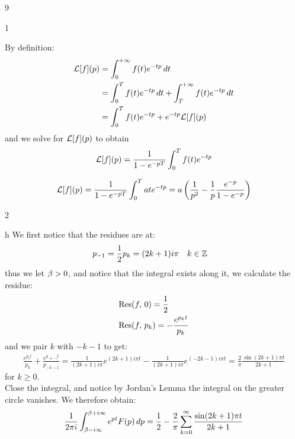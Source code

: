 





\begin{vv286}{9}
  \begin{vv286_mp}{1}
  \item[(i)]
    By definition:
    \begin{align*}
      {\mathcal{L}}[f](p)&=\int_{0}^{+\infty}f(t)e^{-tp}\, dt\\
      &=\int_0^{T}f(t)e^{-tp}\, dt+\int_{T}^{+\infty}f(t)e^{-tp}\, dt\\
      &=\int_0^{T}f(t)e^{-tp}+e^{-tp}\mathcal{L}[f](p)
    \end{align*}
    and we solve for $\mathcal{L}[f](p)$ to obtain
    \begin{equation*}
      \mathcal{L}[f](p)=\frac{1}{1-e^{-pT}}\int_0^{T}f(t)e^{-tp}
    \end{equation*}
   \item[(ii)]
     \begin{align*}
       \mathcal{L}[f](p)=\frac{1}{1-e^{-pT}}\int_0^{T}ate^{-tp}=a\left(\frac{1}{p^2}-\frac{1}{p}\frac{e^{-p}}{1-e^{-p}}\right)
     \end{align*}
  \end{vv286_mp}
  \begin{vv286_mp}{2}
  \item[(i)]h
    We first notice that the residues are at:
    \begin{align*}
      p_{-1}=\frac{1}{2}&
      p_{k}=(2k+1)i\pi\quad k\in\mathbb{Z}
    \end{align*}
    thus we let $\beta>0$, and notice that the integral exists along it, we
    calculate the residue:
   \begin{align*}
     &\hbox{$\mathop{\rm Res}(f,\,0)$}=\frac{1}{2}\\
     &\hbox{$\mathop{\rm Res}(f,\,p_k)$}=-\frac{e^{p_kt}}{p_k}
   \end{align*}
   and we pair $k$ with $-k-1$ to get:
   \begin{align*}
     \frac{e^{p_kt}}{p_k}+\frac{e^{p_{-k-1}t}}{p_{-k-1}}=
     \frac{1}{(2k+1)i\pi}e^{(2k+1)i\pi t}-\frac{1}{(2k+1)i\pi}e^{(-2k-1)i\pi
     t}
     =\frac{2}{\pi}\frac{\sin (2k+1)\pi t}{2k+1}
   \end{align*}
   for $k\ge0$.\\
   Close the integral, and notice by Jordan's Lemma the integral on the
   greater circle vanishes. We therefore obtain:
   \begin{align*}
     \frac{1}{2\pi i}\int_{\b-i\infty}^{\b+i\infty}e^{pt}F(p)\, dp=
     \frac{1}{2}-\frac{2}{\pi}\sum_{k=0}^{\infty}\frac{\sin (2k+1)\pi t}{2k+1}

\end{align*}
\end{vv286_mp}
\end{vv286}
